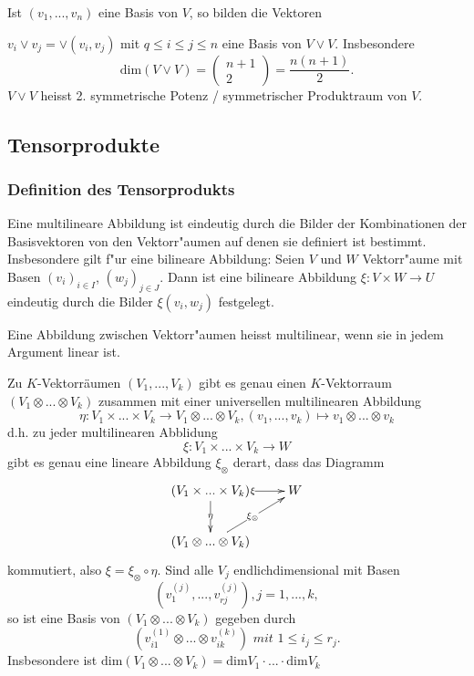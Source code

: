 \documentclass[9pt, a4paper, twocolumn, landscape]{article}
\begin{document}
{\begin{theorem}
Ist $(v_1, ..., v_n)$ eine Basis von $V$, so bilden die Vektoren

$v_i \vee v_j = \vee (v_i, v_j)$ mit $q \leq i \leq j \leq n$ eine Basis von $V \vee V$. Insbesondere
$$
\mathrm{dim}(V \vee V) = \left(\begin{array}{c} n+1\\ 2 
\end{array} \right) = \frac{n(n+1)}{2}.
$$
$V \vee V$ heisst 2. symmetrische Potenz / symmetrischer Produktraum von $V$.
\end{theorem}

}

\subsection{Tensorprodukte}
\subsubsection{Definition des Tensorprodukts}
\begin{remark}
Eine multilineare Abbildung ist eindeutig durch die Bilder der Kombinationen der Basisvektoren von den Vektorr"aumen auf denen sie definiert ist bestimmt. Insbesondere gilt f"ur eine bilineare Abbildung:
Seien $V$ und $W$ Vektorr"aume mit Basen $(v_i)_{i \in I}$, $(w_j)_{j \in J}$. Dann ist eine bilineare Abbildung $\xi : V \times W \rightarrow U$ eindeutig durch die Bilder $\xi(v_i, w_j)$ festgelegt.
\end{remark}

\begin{definition}
Eine Abbildung zwischen Vektorr"aumen heisst multilinear, wenn sie in jedem Argument linear ist. 
\end{definition}

\begin{theorem}
Zu $K$-Vektorräumen $(V_1,...,V_k)$ gibt es genau einen $K$-Vektorraum $(V_1  \otimes ...  \otimes V_k)$ zusammen mit einer universellen multilinearen Abbildung 
$$
\eta : V_1 \times ... \times V_k  \rightarrow V_1\otimes ... \otimes V_k ,   (v_1,...,v_k) \mapsto v_1\otimes...\otimes v_k
$$
d.h. zu jeder multilinearen Abblidung
$$
\xi: V_1 \times ... \times V_k \rightarrow W
$$
gibt es genau eine lineare Abbildung $\xi_\otimes$ derart, dass das Diagramm 
\begin{gather*}
  \xymatrix{(V_1 \times ... \times V_k)  \ar[d]|{\eta} \ar[r]|{\xi} & W\\
    (V_1 \otimes ... \otimes V_k) \ar[ur]|{\xi_\otimes} & }
\end{gather*}
kommutiert, also $\xi = \xi_\otimes \circ \eta$. Sind alle $V_j$ endlichdimensional mit Basen 
$$
(v_1^{(j)},...,v_{rj}^{(j)}), j = 1,...,k,
$$
so ist eine Basis von $(V_1  \otimes ...  \otimes V_k)$ gegeben durch
$$
(v_{i1}^{(1)} \otimes...\otimes v_{ik}^{(k)}) \textit{ mit }  1 \leq i_j \leq r_j.
$$ 
Insbesondere ist $\mathrm{dim}(V_1\otimes...\otimes V_k) = \mathrm{dim} V_1\cdot ... \cdot \mathrm{dim}V_k$
\end{theorem}
\end{document}
